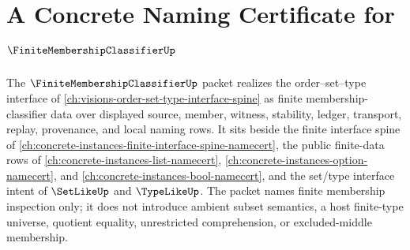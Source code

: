\chapter{A Concrete Naming Certificate for $\FiniteMembershipClassifierUp$}
\label{ch:concrete-instances-finite-membership-classifier-namecert}

The $\FiniteMembershipClassifierUp$ packet realizes the order--set--type interface of \autoref{ch:visions-order-set-type-interface-spine} as finite membership-classifier data over displayed source, member, witness, stability, ledger, transport, replay, provenance, and local naming rows. It sits beside the finite interface spine of \autoref{ch:concrete-instances-finite-interface-spine-namecert}, the public finite-data rows of \autoref{ch:concrete-instances-list-namecert}, \autoref{ch:concrete-instances-option-namecert}, and \autoref{ch:concrete-instances-bool-namecert}, and the set/type interface intent of $\SetLikeUp$ and $\TypeLikeUp$. The packet names finite membership inspection only; it does not introduce ambient subset semantics, a host finite-type universe, quotient equality, unrestricted comprehension, or excluded-middle membership.

